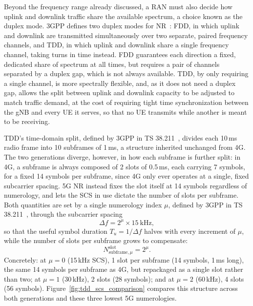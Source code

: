 Beyond the frequency range already discussed, a \gls{RAN} must also decide how uplink and downlink traffic share the available spectrum, a choice known as the duplex mode. \gls{3GPP} defines two duplex modes for \gls{NR}~\cite{3GPP38211}: \gls{FDD}, in which uplink and downlink are transmitted simultaneously over two separate, paired frequency channels, and \gls{TDD}, in which uplink and downlink share a single frequency channel, taking turns in time instead. \gls{FDD} guarantees each direction a fixed, dedicated share of spectrum at all times, but requires a pair of channels separated by a duplex gap, which is not always available. \gls{TDD}, by only requiring a single channel, is more spectrally flexible, and, as it does not need a duplex gap, allows the split between uplink and downlink capacity to be adjusted to match traffic demand, at the cost of requiring tight time synchronization between the \gls{gNB} and every \gls{UE} it serves, so that no \gls{UE} transmits while another is meant to be receiving.

\gls{TDD}'s time-domain split, defined by \gls{3GPP} in TS 38.211~\cite{3GPP38211}, divides each 10\,ms radio frame into 10 subframes of 1\,ms, a structure inherited unchanged from 4G. The two generations diverge, however, in how each subframe is further split: in 4G, a subframe is always composed of 2 slots of 0.5\,ms, each carrying 7  symbols, for a fixed 14 symbols per subframe, since 4G only ever operates at a single, fixed subcarrier spacing. 5G \gls{NR} instead fixes the slot itself at 14  symbols regardless of numerology, and lets the \gls{SCS} in use dictate the number of slots per subframe. Both quantities are set by a single numerology index $\mu$, defined by \gls{3GPP} in TS 38.211~\cite[§4.2]{3GPP38211}, through the subcarrier spacing
\begin{equation}
  \Delta f = 2^{\mu} \times 15\ \text{kHz},
  \label{eq:scs}
\end{equation}
so that the useful symbol duration $T_u = 1/\Delta f$ halves with every increment of $\mu$, while the number of slots per subframe grows to compensate:
\begin{equation}
  N^{\text{slot}}_{\text{subframe},\mu} = 2^{\mu}.
  \label{eq:slots_per_subframe}
\end{equation}
Concretely: at $\mu=0$ (15\,kHz \gls{SCS}), 1 slot per subframe (14 symbols, 1\,ms long), the same 14 symbols per subframe as 4G, but repackaged as a single slot rather than two; at $\mu=1$ (30\,kHz), 2 slots (28 symbols); and at $\mu=2$ (60\,kHz), 4 slots (56 symbols). Figure~\ref{fig:tdd_scs_comparison} compares this structure across both generations and these three lowest 5G numerologies.

